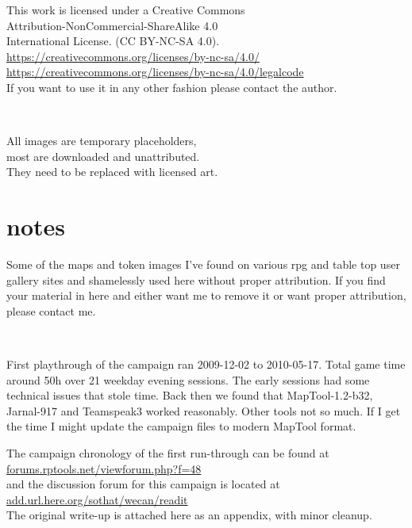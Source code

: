 
\raggedbottom


\thispagestyle{empty} %

\vsmall
\noindent
This work is licensed under a Creative Commons \\
Attribution-NonCommercial-ShareAlike 4.0 \\
International License. (CC BY-NC-SA 4.0).\\
\url{https://creativecommons.org/licenses/by-nc-sa/4.0/} \\
\url{https://creativecommons.org/licenses/by-nc-sa/4.0/legalcode} \\
If you want to use it in any other fashion please contact the author.

\

\noindent
All images are temporary placeholders, \\
most are downloaded and unattributed.\\
They need to be replaced with licensed art.

\normalsize




\vfill

\section*{notes}

Some of the maps and token images I've found on various rpg and table top user gallery sites and shamelessly used here without proper attribution. If you find your material in here and either want me to remove it or want proper attribution, please contact me.

\

First playthrough of the campaign ran 2009-12-02 to 2010-05-17. Total game time around 50h over 21 weekday evening sessions.
The early sessions had some technical issues that stole time. Back then we found that MapTool-1.2-b32, Jarnal-917 and Teamspeak3 worked reasonably. Other tools not so much. If I get the time I might update the campaign files to modern MapTool format.

\noindent The campaign chronology of the first run-through can be found at \\
\url{forums.rptools.net/viewforum.php?f=48} \\
and the discussion forum for this campaign is located at \\
\url{add.url.here.org/sothat/wecan/readit} \\
The original write-up is attached here as an appendix, with minor cleanup.

